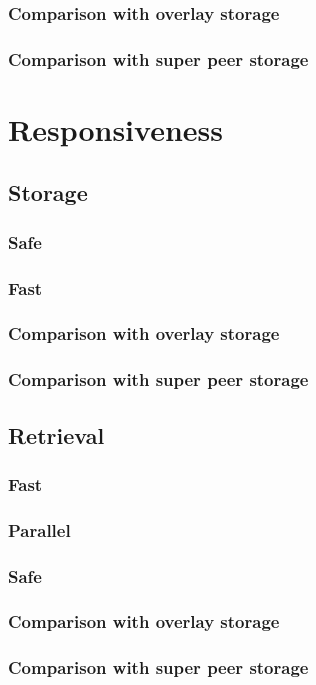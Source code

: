             \subsubsection{Comparison with overlay storage}
            \subsubsection{Comparison with super peer storage}
    \section{Responsiveness}
    \label{responsiveness_compare}
        \subsection{Storage}
        \label{responsiveness_compare_storage}
            \subsubsection{Safe}
            \subsubsection{Fast}
            \subsubsection{Comparison with overlay storage}
            \subsubsection{Comparison with super peer storage}
        \subsection{Retrieval}
        \label{responsiveness_compare_retrieval}
            \subsubsection{Fast}
            \subsubsection{Parallel}
            \subsubsection{Safe}
            \subsubsection{Comparison with overlay storage}
            \subsubsection{Comparison with super peer storage}
